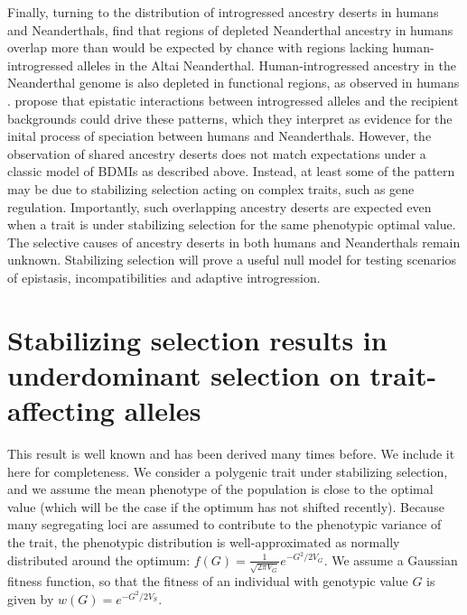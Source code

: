 \documentclass{article}
\begin{document}
Finally, turning to the distribution of introgressed ancestry deserts in humans
and Neanderthals, \citet{harris2023diverse} find that regions of depleted
Neanderthal ancestry in humans overlap more than would be expected by chance
with regions lacking human-introgressed alleles in the Altai Neanderthal.
Human-introgressed ancestry in the Neanderthal genome is also depleted in
functional regions, as observed in humans \citep{sankararaman2014genomic}.
\citet{harris2023diverse} propose that epistatic interactions between
introgressed alleles and the recipient backgrounds could drive these patterns,
which they interpret as evidence for the inital process of speciation between
humans and Neanderthals. However, the observation of shared ancestry deserts
does not match expectations under a classic model of BDMIs as described above.
Instead, at least some of the pattern may be due to stabilizing selection
acting on complex traits, such as gene regulation. Importantly, such
overlapping ancestry deserts are expected even when a trait is under
stabilizing selection for the same phenotypic optimal value. The selective
causes of ancestry deserts in both humans and Neanderthals remain unknown.
Stabilizing selection will prove a useful null model for testing scenarios of
epistasis, incompatibilities and adaptive introgression.





\appendix

\section{Stabilizing selection results in underdominant selection on
trait-affecting alleles} \label{sec:underdominance}

This result is well known and has been derived many times before. We include it
here for completeness. We consider a polygenic trait under stabilizing
selection, and we assume the mean phenotype of the population is close to the
optimal value (which will be the case if the optimum has not shifted recently).
Because many segregating loci are assumed to contribute to the phenotypic
variance of the trait, the phenotypic distribution is well-approximated as
normally distributed around the optimum: \(f(G)=\frac{1}{\sqrt{2\pi V_G}}
e^{-G^2/2V_G}\). We assume a Gaussian fitness function, so that the fitness
of an individual with genotypic value $G$ is given by \(w(G)=e^{-G^2/2V_S}\).
\end{document}
